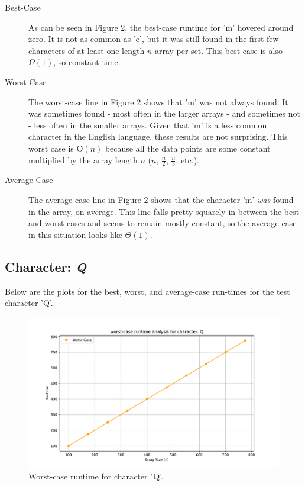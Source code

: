 \documentclass{article}
\begin{document}
 \begin{description}
    \item[Best-Case] As can be seen in Figure 2, the best-case runtime for 'm' hovered around zero. It is not as common as 'e', but it was still found in the first few characters of at least one length $n$ array per set. This best case is also $\Omega(1)$, so constant time.
    \item[Worst-Case] The worst-case line in Figure 2 shows that 'm' was not always found. It was sometimes found - most often in the larger arrays - and sometimes not - less often in the smaller arrays. Given that 'm' is a less common character in the English language, these results are not surprising. This worst case is O$(n)$ because all the data points are some constant multiplied by the array length $n$ ($n$, $\frac{n}{2}$, $\frac{n}{3}$, etc.).
    \item[Average-Case] The average-case line in Figure 2 shows that the character 'm' \textit{was} found in the array, on average. This line falls pretty squarely in between the best and worst cases and seems to remain mostly constant, so the average-case in this situation looks like $\Theta(1)$. 
\end{description}

\subsection{Character: \textit{Q}}
Below are the plots for the best, worst, and average-case run-times for the test character 'Q'.
	
	\begin{figure}[H]
		\centering
		\includegraphics[width=\textwidth]{runtime_analysis_worst_Q.pdf}
		\caption{Worst-case runtime for character "Q'.}
	\end{figure}
\end{document}
